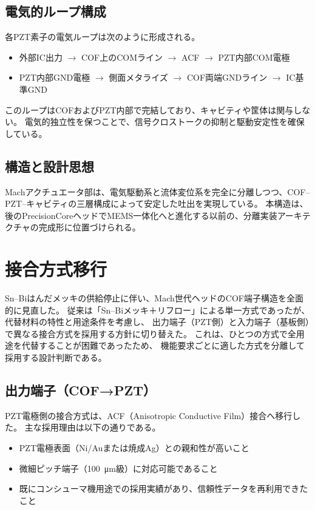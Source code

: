 \documentclass[conference]{IEEEtran}
\begin{document}
\subsection{電気的ループ構成}
各PZT素子の電気ループは次のように形成される。  
\begin{itemize}
  \item 外部IC出力 $\rightarrow$ COF上のCOMライン $\rightarrow$ ACF $\rightarrow$ PZT内部COM電極
  \item PZT内部GND電極 $\rightarrow$ 側面メタライズ $\rightarrow$ COF両端GNDライン $\rightarrow$ IC基準GND
\end{itemize}
このループはCOFおよびPZT内部で完結しており、キャビティや筐体は関与しない。  
電気的独立性を保つことで、信号クロストークの抑制と駆動安定性を確保している。

\subsection{構造と設計思想}
Machアクチュエータ部は、電気駆動系と流体変位系を完全に分離しつつ、COF–PZT–キャビティの三層構成によって安定した吐出を実現している。  
本構造は、後のPrecisionCoreヘッドでMEMS一体化へと進化する以前の、分離実装アーキテクチャの完成形に位置づけられる。

\section{接合方式移行}

Sn–Biはんだメッキの供給停止に伴い、Mach世代ヘッドのCOF端子構造を全面的に見直した。  
従来は「Sn–Biメッキ＋リフロー」による単一方式であったが、代替材料の特性と用途条件を考慮し、  
出力端子（PZT側）と入力端子（基板側）で異なる接合方式を採用する方針に切り替えた。  
これは、ひとつの方式で全用途を代替することが困難であったため、  
機能要求ごとに適した方式を分離して採用する設計判断である。

\subsection{出力端子（COF→PZT）}
PZT電極側の接合方式は、ACF（Anisotropic Conductive Film）接合へ移行した。  
主な採用理由は以下の通りである。

\begin{itemize}
  \item PZT電極表面（Ni/Auまたは焼成Ag）との親和性が高いこと  
  \item 微細ピッチ端子（\SI{100}{\micro m}級）に対応可能であること  
  \item 既にコンシューマ機用途での採用実績があり、信頼性データを再利用できたこと
\end{itemize}
\end{document}
